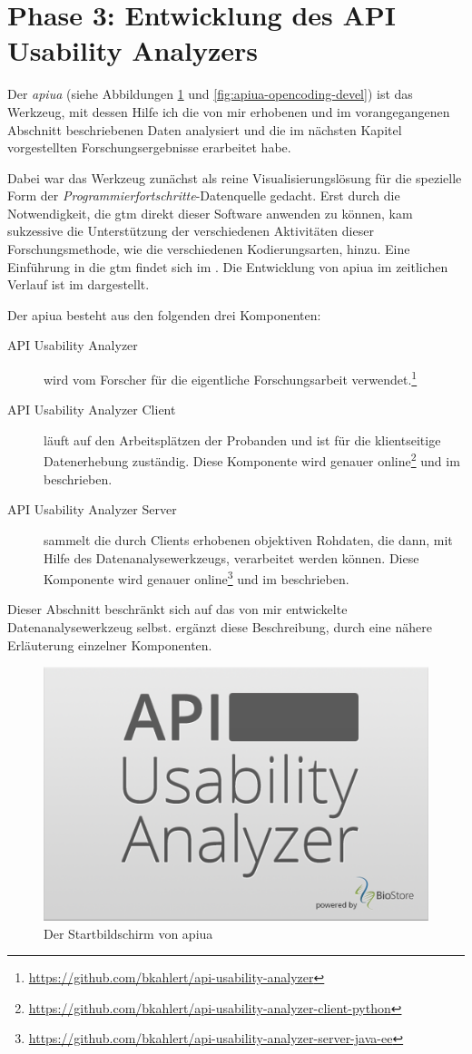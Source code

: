 \section{Phase 3: Entwicklung des API Usability Analyzers}
\label{sec:apiua}

Der \textit{\acrfull{apiua}} (siehe Abbildungen \ref{fig:apiua-splash} und \ref{fig:apiua-opencoding-devel}) ist das Werkzeug, mit dessen Hilfe ich die von mir erhobenen und im vorangegangenen Abschnitt beschriebenen Daten analysiert und die im nächsten Kapitel vorgestellten Forschungsergebnisse erarbeitet habe.

Dabei war das Werkzeug zunächst als reine Visualisierungslösung für die spezielle Form der \textit{Programmierfortschritte}-Datenquelle gedacht. Erst durch die Notwendigkeit, die \gls{gtm} direkt dieser Software anwenden zu können, kam sukzessive die Unterstützung der verschiedenen Aktivitäten dieser Forschungsmethode, wie die verschiedenen Kodierungsarten, hinzu. Eine Einführung in die \gls{gtm} findet sich im . Die Entwicklung von \gls{apiua} im zeitlichen Verlauf ist im  dargestellt.

Der \acrlong{apiua} besteht aus den folgenden drei Komponenten:
\begin{description}
  \item[API Usability Analyzer] wird vom Forscher für die eigentliche Forschungsarbeit verwendet.\footnote{\url{https://github.com/bkahlert/api-usability-analyzer}}
  \item[API Usability Analyzer Client] läuft auf den Arbeitsplätzen der Probanden und ist für die klientseitige Datenerhebung zuständig. Diese Komponente wird genauer online\footnote{\url{https://github.com/bkahlert/api-usability-analyzer-client-python}} und im  beschrieben.
  \item[API Usability Analyzer Server] sammelt die durch Clients erhobenen objektiven Rohdaten, die dann, mit Hilfe des Datenanalysewerkzeugs, verarbeitet werden können. Diese Komponente wird genauer online\footnote{\url{https://github.com/bkahlert/api-usability-analyzer-server-java-ee}} und im  beschrieben.
\end{description}

Dieser Abschnitt beschränkt sich auf das von mir entwickelte Datenanalysewerkzeug selbst.  ergänzt diese Beschreibung, durch eine nähere Erläuterung einzelner Komponenten.

\begin{figure}[ht!]
  \centering
    \includegraphics[width=0.4\linewidth]{Figures/apiua/splash.png}
  \caption[APIUA: Startbildschirm]{Der Startbildschirm von \gls{apiua}}
  \label{fig:apiua-splash}
\end{figure}

